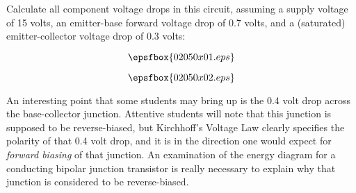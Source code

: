 

Calculate all component voltage drops in this circuit, assuming a supply voltage of 15 volts, an emitter-base forward voltage drop of 0.7 volts, and a (saturated) emitter-collector voltage drop of 0.3 volts:

$$\epsfbox{02050x01.eps}$$







$$\epsfbox{02050x02.eps}$$







An interesting point that some students may bring up is the 0.4 volt drop across the base-collector junction.  Attentive students will note that this junction is supposed to be reverse-biased, but Kirchhoff's Voltage Law clearly specifies the polarity of that 0.4 volt drop, and it is in the direction one would expect for {\it forward biasing} of that junction.  An examination of the energy diagram for a conducting bipolar junction transistor is really necessary to explain why that junction is considered to be reverse-biased.




